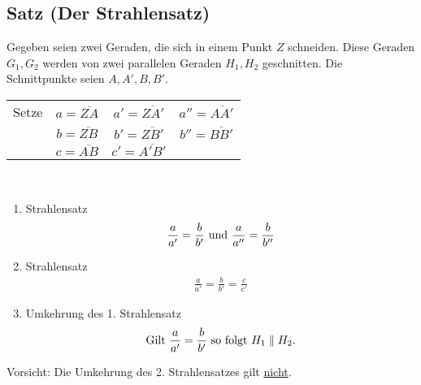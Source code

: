 	
\subsection[Der Strahlensatz]{Satz (Der Strahlensatz)}

	Gegeben seien zwei Geraden, die sich in einem Punkt $Z$ schneiden. Diese Geraden $G_1,G_2$ werden von zwei
	parallelen Geraden $H_1,H_2$ geschnitten. Die Schnittpunkte seien $A,A',B,B'$.\\
	\newline
	
	\begin{tabular}{cccc}
	Setze	& $a=\overline{ZA}$	& $a'=\overline{ZA'}$	& $a''=\overline{AA'}$\\
			& $b=\overline{ZB}$	& $b'=\overline{ZB'}$	& $b''=\overline{BB'}$\\
			& $c=\overline{AB}$	& $c'=\overline{A'B'}$	&
	\end{tabular}
	~\newline
	\begin{enumerate}
	\item Strahlensatz
	\begin{align*}
	\frac{a}{a'}=\frac{b}{b'} \textnormal{ und } \frac{a}{a''}=\frac{b}{b''}
	\end{align*}
	
	\item Strahlensatz
	\begin{align*}
	\frac{a}{a'}=\frac{b}{b'}=\frac{c}{c'}
	\end{align*}
	
	\item Umkehrung des 1. Strahlensatz
	\begin{align*}
	\textnormal{Gilt } \frac{a}{a'}=\frac{b}{b'} \textnormal{ so folgt } H_1\parallel H_2.
	\end{align*}
	\end{enumerate}
	
	Vorsicht: Die Umkehrung des 2. Strahlensatzes gilt \underline{nicht}.\\
	\newline\newline
	
